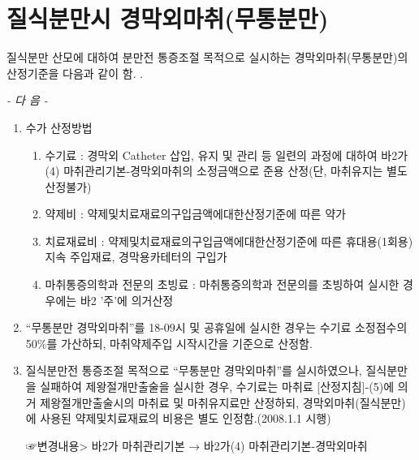 \section{질식분만시 경막외마취(무통분만)}
% 
{
질식분만 산모에 대하여 분만전 통증조절 목적으로 실시하는 경막외마취(무통분만)의 산정기준을 다음과 같이 함.
.\par
\begin{center}\emph{- 다   음 -}\end{center}
\begin{enumerate}[가.]\tightlist
\item 수가 산정방법 
	\begin{enumerate}[(1)]\tightlist
	\item 수기료 : 경막외 Catheter 삽입, 유지 및 관리 등 일련의 과정에 대하여 바2가(4) 마취관리기본-경막외마취의 소정금액으로 준용 산정(단, 마취유지는 별도 산정불가) 
	\item 약제비 : 약제및치료재료의구입금액에대한산정기준에 따른 약가 
	\item 치료재료비 : 약제및치료재료의구입금액에대한산정기준에 따른 휴대용(1회용) 지속 주입재료, 경막용카테터의 구입가 
	\item 마취통증의학과 전문의 초빙료 : 마취통증의학과 전문의를 초빙하여 실시한 경우에는 바2 '주'에 의거산정 
	\end{enumerate}
\item “무통분만 경막외마취”를 18-09시 및 공휴일에 실시한 경우는 수기료 소정점수의 50\%를 가산하되, 마취약제주입 시작시간을 기준으로 산정함.
\item 질식분만전 통증조절 목적으로 “무통분만 경막외마취”를 실시하였으나, 질식분만을 실패하여 제왕절개만출술을 실시한 경우, 수기료는 마취료 [산정지침]-(5)에 의거 제왕절개만출술시의 마취료 및 마취유지료만 산정하되, 경막외마취(질식분만)에 사용된 약제및치료재료의 비용은 별도 인정함.(2008.1.1 시행)\par
☞변경내용> 바2가 마취관리기본 → 바2가(4) 마취관리기본-경막외마취
\end{enumerate}
}%

